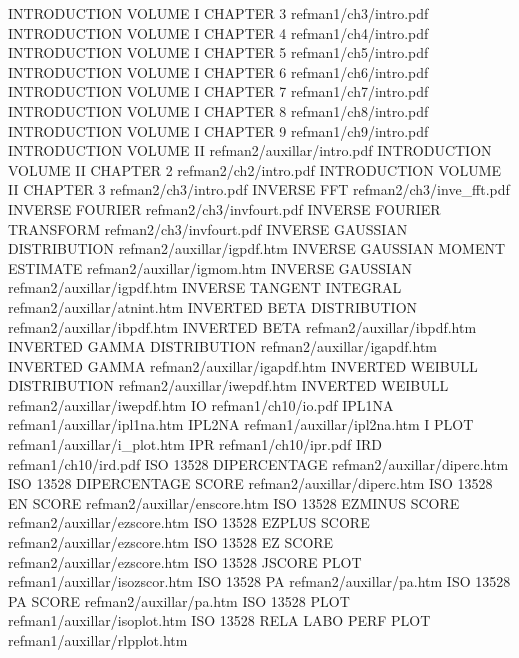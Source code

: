 INTRODUCTION VOLUME I CHAPTER 3         refman1/ch3/intro.pdf
INTRODUCTION VOLUME I CHAPTER 4         refman1/ch4/intro.pdf
INTRODUCTION VOLUME I CHAPTER 5         refman1/ch5/intro.pdf
INTRODUCTION VOLUME I CHAPTER 6         refman1/ch6/intro.pdf
INTRODUCTION VOLUME I CHAPTER 7         refman1/ch7/intro.pdf
INTRODUCTION VOLUME I CHAPTER 8         refman1/ch8/intro.pdf
INTRODUCTION VOLUME I CHAPTER 9         refman1/ch9/intro.pdf
INTRODUCTION VOLUME II                  refman2/auxillar/intro.pdf
INTRODUCTION VOLUME II CHAPTER 2        refman2/ch2/intro.pdf
INTRODUCTION VOLUME II CHAPTER 3        refman2/ch3/intro.pdf
INVERSE FFT                             refman2/ch3/inve_fft.pdf
INVERSE FOURIER                         refman2/ch3/invfourt.pdf
INVERSE FOURIER TRANSFORM               refman2/ch3/invfourt.pdf
INVERSE GAUSSIAN DISTRIBUTION           refman2/auxillar/igpdf.htm
INVERSE GAUSSIAN MOMENT ESTIMATE        refman2/auxillar/igmom.htm
INVERSE GAUSSIAN                        refman2/auxillar/igpdf.htm
INVERSE TANGENT INTEGRAL                refman2/auxillar/atnint.htm
INVERTED BETA DISTRIBUTION              refman2/auxillar/ibpdf.htm
INVERTED BETA                           refman2/auxillar/ibpdf.htm
INVERTED GAMMA DISTRIBUTION             refman2/auxillar/igapdf.htm
INVERTED GAMMA                          refman2/auxillar/igapdf.htm
INVERTED WEIBULL DISTRIBUTION           refman2/auxillar/iwepdf.htm
INVERTED WEIBULL                        refman2/auxillar/iwepdf.htm
IO                                      refman1/ch10/io.pdf
IPL1NA                                  refman1/auxillar/ipl1na.htm
IPL2NA                                  refman1/auxillar/ipl2na.htm
I PLOT                                  refman1/auxillar/i_plot.htm
IPR                                     refman1/ch10/ipr.pdf
IRD                                     refman1/ch10/ird.pdf
ISO 13528 DIPERCENTAGE                  refman2/auxillar/diperc.htm
ISO 13528 DIPERCENTAGE SCORE            refman2/auxillar/diperc.htm
ISO 13528 EN SCORE                      refman2/auxillar/enscore.htm
ISO 13528 EZMINUS SCORE                 refman2/auxillar/ezscore.htm
ISO 13528 EZPLUS SCORE                  refman2/auxillar/ezscore.htm
ISO 13528 EZ SCORE                      refman2/auxillar/ezscore.htm
ISO 13528 JSCORE PLOT                   refman1/auxillar/isozscor.htm
ISO 13528 PA                            refman2/auxillar/pa.htm
ISO 13528 PA SCORE                      refman2/auxillar/pa.htm
ISO 13528 PLOT                          refman1/auxillar/isoplot.htm
ISO 13528 RELA LABO PERF PLOT           refman1/auxillar/rlpplot.htm
